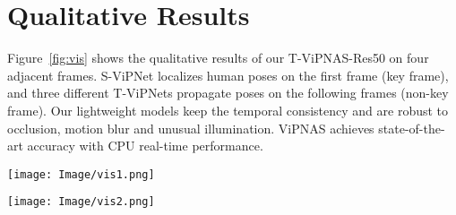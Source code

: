 \documentclass[final]{cvpr}
\begin{document}
\section{Qualitative Results}
Figure~\ref{fig:vis} shows the qualitative results of our T-ViPNAS-Res50 on four adjacent frames. S-ViPNet localizes human poses on the first frame (key frame), and three different T-ViPNets propagate poses on the following frames (non-key frame). Our lightweight models keep the temporal consistency and are robust to occlusion, motion blur and unusual illumination. ViPNAS achieves state-of-the-art accuracy with CPU real-time performance.

\begin{figure*}[t]
	\centering
	\texttt{[image: Image/vis1.png]}
\end{figure*}

\begin{figure*}[t]
	\centering
	\texttt{[image: Image/vis2.png]}
	\caption{Qualitative results of T-ViPNAS-Res50 on four adjacent frames. S-ViPNet localizes human poses on the first frame, and three different T-ViPNets propagate poses on the following frames. Our proposed ViPNAS is robust to occlusion, motion blur and unusual illumination, and achieves state-of-art accuracy with CPU real-time performance.}
	\label{fig:vis}
\end{figure*}
\end{document}
